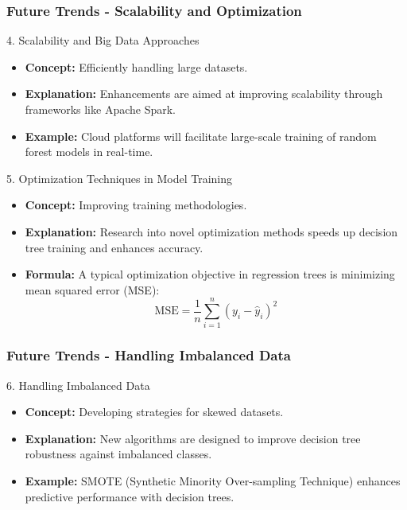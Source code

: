 \documentclass[aspectratio=169]{beamer}
\begin{document}
\begin{frame}[fragile]
  \frametitle{Future Trends - Scalability and Optimization}
  \begin{block}{4. Scalability and Big Data Approaches}
    \begin{itemize}
      \item \textbf{Concept:} Efficiently handling large datasets.
      \item \textbf{Explanation:} Enhancements are aimed at improving scalability through frameworks like Apache Spark.
      \item \textbf{Example:} Cloud platforms will facilitate large-scale training of random forest models in real-time.
    \end{itemize}
  \end{block}

  \begin{block}{5. Optimization Techniques in Model Training}
    \begin{itemize}
      \item \textbf{Concept:} Improving training methodologies.
      \item \textbf{Explanation:} Research into novel optimization methods speeds up decision tree training and enhances accuracy.
      \item \textbf{Formula:} A typical optimization objective in regression trees is minimizing mean squared error (MSE):
      \begin{equation}
        \text{MSE} = \frac{1}{n}\sum_{i=1}^{n} (y_i - \hat{y}_i)^2
      \end{equation}
    \end{itemize}
  \end{block}
\end{frame}

\begin{frame}[fragile]
  \frametitle{Future Trends - Handling Imbalanced Data}
  \begin{block}{6. Handling Imbalanced Data}
    \begin{itemize}
      \item \textbf{Concept:} Developing strategies for skewed datasets.
      \item \textbf{Explanation:} New algorithms are designed to improve decision tree robustness against imbalanced classes.
      \item \textbf{Example:} SMOTE (Synthetic Minority Over-sampling Technique) enhances predictive performance with decision trees.
    \end{itemize}
  \end{block}
\end{frame}
\end{document}
